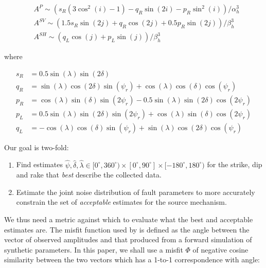 \documentclass[preprint]{seismica}
\begin{document}
    \begin{align} \label{eq:1}
      \nonumber &A^P \sim \left( s_R(3\cos^2(i) - 1) - q_R\sin(2i) - p_R\sin^2(i)\right)/\alpha_h^3\\
      \nonumber &A^{SV} \sim \left( 1.5 s_R\sin(2j) + q_R\cos(2j) + 0.5 p_R\sin(2j) \right)/\beta_h^3\\
      &A^{SH} \sim \left( q_L\cos(j) + p_L\sin(j) \right)/\beta_h^3
    \end{align}

    where

    \begin{align} \label{eq:2}
      \nonumber s_R &= 0.5 \sin(\lambda) \sin(2\delta)\\
      \nonumber q_R &= \sin(\lambda) \cos(2\delta) \sin(\psi_r) + \cos(\lambda) \cos(\delta) \cos(\psi_r)\\
      \nonumber p_R &= \cos(\lambda) \sin(\delta) \sin(2\psi_r) - 0.5\sin(\lambda) \sin(2\delta) \cos(2\psi_r)\\
      \nonumber p_L &= 0.5\sin(\lambda) \sin(2\delta) \sin(2\psi_r) + \cos(\lambda) \sin(\delta) \cos(2\psi_r)\\
      q_L &= -\cos(\lambda) \cos(\delta) \sin(\psi_r) + \sin(\lambda) \cos(2\delta) \cos(\psi_r)
    \end{align}

    Our goal is two-fold:
    \begin{enumerate}
      \item [i)]
        Find estimates $\widehat{\psi}, \widehat{\delta}, \widehat{\lambda} \in [0^\circ,360^\circ) \times 
        [0^\circ,90^\circ] \times [-180^\circ,180^\circ)$ for the strike, dip and rake that \textit{best} describe
        the collected data.

      \item [ii)]
        Estimate the joint noise distribution of fault parameters to more accurately constrain the
        set of \textit{acceptable} estimates for the source mechanism.
        
    \end{enumerate}

    We thus need a metric against which to evaluate what the best and acceptable estimates are. The
    misfit function used by \citet{sita_potential_2022} is defined as the angle between the vector of
    observed amplitudes and that produced from a forward simulation of synthetic parameters.
    In this paper, we shall use a misfit $\Phi$ of negative cosine similarity between the two vectors
    which has a 1-to-1 correspondence with angle:
\end{document}
